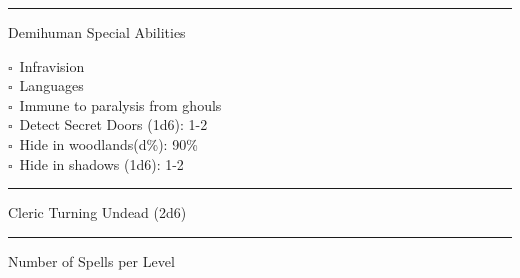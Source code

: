 \documentclass{article}
\begin{document}
\rule{\textwidth}{2pt}
\Huge Demihuman Special Abilities\\
\Large


\begin{multicols}{3}
  $\square$~Infravision \\
  $\square$~Languages \\
  $\square$~Immune to paralysis from ghouls\\
  $\square$~Detect Secret Doors (1d6): 1-2 \\
  $\square$~Hide in woodlands(d\%): 90\%\\
  $\square$~Hide in shadows (1d6): 1-2
\end{multicols} \rule{\textwidth}{2pt}
\Huge Cleric Turning Undead (2d6)\\
\Large\hfill {} \hfill
   \hfill
   \hfill
   \hfill{}



  

  

  \rule{\textwidth}{2pt}
  \Huge
  Number of Spells per Level


  \vfill

  
\end{document}
